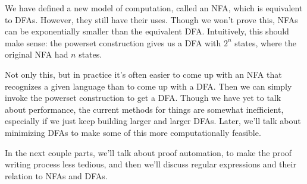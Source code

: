 We have defined a new model of computation, called an NFA, which is equivalent to DFAs.
However, they still have their uses.
Though we won't prove this, NFAs can be exponentially smaller than the equivalent DFA.
Intuitively, this should make sense: the powerset construction gives us a DFA with $2^n$ states, where the original NFA had $n$ states.

Not only this, but in practice it's often easier to come up with an NFA that recognizes a given language than to come up with a DFA.
Then we can simply invoke the powerset construction to get a DFA.
Though we have yet to talk about performance, the current methods for things are somewhat inefficient, especially if we just keep building larger and larger DFAs.
Later, we'll talk about minimizing DFAs to make some of this more computationally feasible.

In the next couple parts, we'll talk about proof automation, to make the proof writing process less tedious, and then we'll discuss regular expressions and their relation to NFAs and DFAs.

